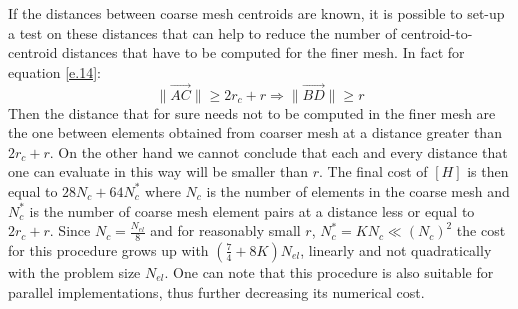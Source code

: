   If the distances between coarse mesh centroids are known, it is possible to set-up a test on these distances that can help to reduce the number of centroid-to-centroid distances that have to be computed for the finer mesh.
  In fact for equation \ref{e.14}:
   \begin{equation}
    \label{e.15}
     \|\vec{AC}\|\geq 2r_{c}+r \Rightarrow\| \vec{BD}\|\geq r
    \end{equation}
   Then the distance that for sure needs not to be computed in the finer mesh are the one between elements obtained from coarser mesh at a distance greater than $2r_{c}+r$. On the other hand we cannot conclude that each and every distance that one can evaluate in this way will be smaller than $r$. The final cost of $\left[H\right]$ is then equal to $28N_c+64N_c^*$ where $N_c$ is the number of elements in the coarse mesh and $N_c^*$ is the number of coarse mesh element pairs at a distance less or equal to $ 2r_{c}+r$. Since $N_c=\frac{N_{el}}{8}$ and for reasonably small $r$, $N_c^*=KN_c \ll (N_c)^2$ the cost for this procedure grows up with $(\frac{7}{4}+8K)N_{el}$, linearly and not quadratically with the problem size $N_{el}$. One can note that this procedure is also suitable for parallel implementations, thus further decreasing its numerical cost.
   \newpage
